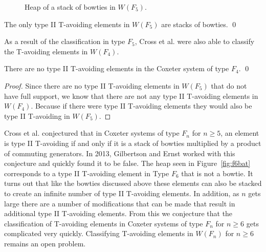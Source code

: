 \begin{figure*}[h!] \centering
{}
\caption{Heap of a stack of bowties in $W(F_5)$.}\label{fig:stackobowties}
\end{figure*}

\begin{proposition}
The only type II T-avoiding elements in $W(F_5)$ are stacks of bowties. \qed	
\end{proposition}


As a result of the classification in type $F_5$, Cross et al. were also able to classify the T-avoiding elements in $W(F_4)$. 

\begin{corollary}
There are no type II T-avoiding elements in the Coxeter system of type $F_4$. \qed	
\begin{proof}
	Since there are no type II T-avoiding elements in $W(F_5)$ that do not have full support, we know that there are not any type II T-avoiding elements in $W(F_4)$. Because if there were type II T-avoiding elements they would also be type II T-avoiding in $W(F_5)$.
\end{proof}
\end{corollary}

Cross et al. conjectured that in Coxeter systems of type $F_n$ for $n \geq 5$, an element is type II T-avoiding if and only if it is a stack of bowties multiplied by a product of commuting generators. In 2013, Gilbertson and Ernst worked with this conjecture and quickly found it to be false. The heap seen in Figure~\ref{fig:f6bat} corresponds to a type II T-avoiding element in Type $F_6$ that is not a bowtie. It turns out that like the bowties discussed above these elements can also be stacked to create an infinite number of type II T-avoiding elements. In addition, as $n$ gets large there are a number of modifications that can be made that result in additional type II T-avoiding elements. From this we conjecture that the classification of T-avoiding elements in Coxeter systems of type $F_n$ for $n \geq 6$ gets complicated very quickly. Classifying T-avoiding elements in $W(F_n)$ for $n \geq 6$ remains an open problem. 

